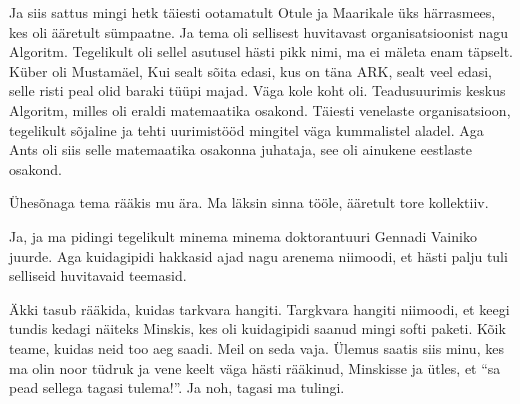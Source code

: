 Ja siis sattus mingi hetk täiesti ootamatult Otule ja Maarikale üks härrasmees, kes oli ääretult sümpaatne. Ja tema oli sellisest huvitavast organisatsioonist nagu Algoritm.  Tegelikult  oli sellel asutusel hästi pikk nimi, ma ei mäleta enam täpselt. Küber oli Mustamäel, Kui sealt sõita edasi, kus on täna ARK, sealt veel edasi, selle risti peal olid baraki tüüpi majad. Väga  kole koht oli. Teadusuurimis keskus Algoritm, milles oli eraldi matemaatika osakond. Täiesti venelaste organisatsioon, tegelikult sõjaline ja tehti uurimistööd mingitel väga kummalistel aladel. Aga Ants oli siis selle matemaatika osakonna juhataja, see oli ainukene eestlaste osakond. 

Ühesõnaga tema rääkis mu ära. Ma läksin sinna tööle,  ääretult tore kollektiiv. 


Ja, ja ma pidingi tegelikult minema minema doktorantuuri Gennadi Vainiko juurde. Aga kuidagipidi  hakkasid ajad nagu arenema niimoodi, et hästi palju tuli selliseid huvitavaid teemasid. 

Äkki tasub  rääkida, kuidas tarkvara hangiti. Targkvara hangiti niimoodi, et keegi tundis kedagi näiteks Minskis, kes oli kuidagipidi saanud mingi softi paketi. Kõik teame, kuidas neid too aeg saadi. Meil on seda vaja. Ülemus saatis siis minu, kes ma olin  noor tüdruk ja vene keelt väga hästi rääkinud, Minskisse ja ütles, et \enquote{sa pead sellega tagasi tulema!}. Ja noh, tagasi ma tulingi. 

